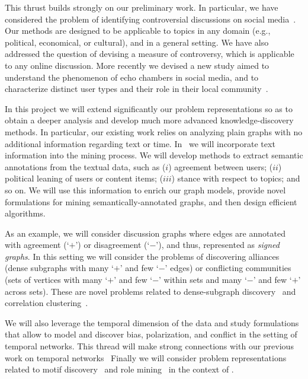 \documentclass[a4paper,11pt]{article}
\begin{document}
\medskip
This thrust builds strongly on our preliminary work.
In particular, we have considered the problem 
of identifying controversial discussions on social media~\cite{garimella2018quantifying}.
Our methods are designed to be applicable to topics in any domain 
(e.g., political, economical, or cultural), and in a general setting.
We have also addressed the question of devising a measure of controversy,
which is applicable to any online discussion.
More recently we devised a new study aimed to 
understand the phenomenon of echo chambers in social media, 
and to characterize distinct user types and their role in their local community~\cite{garimella2018political}.

\smallskip
In this project we will extend significantly our problem representations
so as to obtain a deeper analysis and develop much more advanced knowledge-discovery methods.
In particular, our existing work relies on analyzing plain graphs
with no additional information regarding text or time. 
In \acronym\ we will incorporate text information into the mining process.
We will develop methods to extract semantic annotations from the textual data, 
such as
($i$) agreement between users; 
($ii$) political leaning of users or content items; 
($iii$) stance with respect to topics; 
and so on.
We will use this information to enrich our graph models,
provide novel formulations for mining semantically-annotated graphs, 
and then design efficient algorithms.

\smallskip
As an example, we will consider discussion graphs
where edges are annotated with agreement (`$+$') or disagreement (`$-$'), 
and thus, represented as {\em signed graphs}.
In this setting we will consider the problems of discovering alliances 
(dense subgraphs with many `$+$' and few `$-$' edges) 
or conflicting communities
(sets of vertices with many `$+$' and few `$-$' within sets and many `$-$' and few `$+$' across sets). 
These are novel problems related to dense-subgraph discovery~\cite{rozenshtein2014event,sozio2010community-search,tatti2015density,tsourakakis2013denser}
and correlation clustering~\cite{bansal2004correlation,gionis2007clustering}.

\smallskip
We will also leverage the temporal dimension of the data
and study formulations that allow to model and discover 
bias, polarization, and conflict in the setting of temporal networks.
This thread will make strong connections with our previous work on 
temporal networks~\cite{rozenshtein2016temporal, rozenshtein2016reconstructing, rozenshtein2017finding}
Finally we will consider problem representations  
related to motif discovery~\cite{aslay2018mining,coletto2017motif} and role mining~\cite{arockiasamy2016combinatorial} 
in the context of \acronym.
\end{document}
